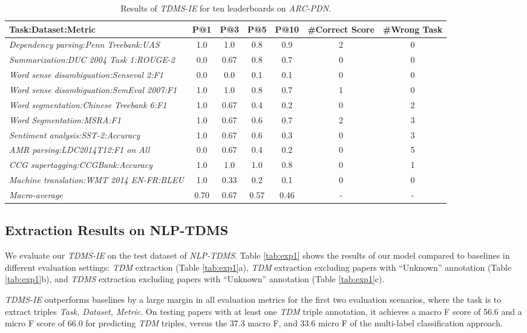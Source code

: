\documentclass[11pt,a4paper]{article}
\begin{document}
\begin{table*}
\begin{center}
\small
\begin{tabular}{l cccc cc }
\hline
Task:Dataset:Metric& P@1&P@3&P@5&P@10&\#Correct Score&\#Wrong Task\\ \hline
\emph{Dependency parsing:Penn Treebank:UAS}&1.0&1.0&0.8&0.9&2&0 \\
\emph{Summarization:DUC 2004 Task 1:ROUGE-2}&0.0&0.67&0.8&0.7&0&0 \\
\emph{Word sense disambiguation:Senseval 2:F1}&0.0&0.0&0.1&0.1&0&0 \\
\emph{Word sense disambiguation:SemEval 2007:F1}&1.0&1.0&0.8&0.7&1&0 \\
\emph{Word segmentation:Chinese Treebank 6:F1}&1.0&0.67&0.4&0.2&0&2 \\
\emph{Word Segmentation:MSRA:F1}&1.0&0.67&0.6&0.7&2&3 \\
\emph{Sentiment analysis:SST-2:Accuracy}&1.0&0.67&0.6&0.3&0&3 \\
\emph{AMR parsing:LDC2014T12:F1 on All}&0.0&0.67&0.4&0.2&0&5 \\
\emph{CCG supertagging:CCGBank:Accuracy}&1.0&1.0&1.0&0.8&0&1 \\
\emph{Machine translation:WMT 2014 EN-FR:BLEU}&1.0&0.33&0.2&0.1&0&0 \\ \hline
\emph{Macro-average}&0.70&0.67&0.57&0.46&-&- \\

 \hline
\end{tabular}
\end{center}
\caption{\label{tab:exp2}  Results of \emph{TDMS-IE}  for ten leaderboards  on  \emph{ARC-PDN}.}
\end{table*}

\subsection{Extraction Results on NLP-TDMS}\label{sec:nlptdes_results}
We evaluate our \emph{TDMS-IE} on the test dataset of \emph{NLP-TDMS}.
Table \ref{tab:exp1} shows the results of our model compared to baselines in different 
evaluation settings: \emph{TDM} extraction (Table \ref{tab:exp1}a), \emph{TDM} extraction excluding papers with ``Unknown'' annotation (Table \ref{tab:exp1}b), and \emph{TDMS} extraction excluding papers with ``Unknown'' annotation (Table \ref{tab:exp1}c).

\emph{TDMS-IE} outperforms baselines by a large margin in all evaluation metrics for the first two evaluation scenarios, where the task is to extract triples \emph{Task, Dataset, Metric}. On testing papers with at least one \emph{TDM} triple annotation, it achieves a macro F score of 56.6 and a micro F score of 66.0 for predicting \emph{TDM} triples, versus the 37.3 macro F, and 33.6 micro F of the multi-label classification approach.
\end{document}
